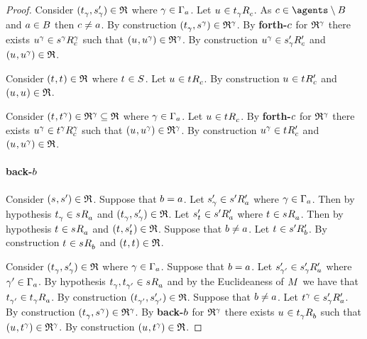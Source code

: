 \begin{proof}
Consider $(\kStateT_\gamma, \kStateSP_\gamma) \in \refinement$ where $\gamma \in \Gamma_\agentA$.
Let $\kStateU \in \kSuccessorsC{\kStateT_\gamma}$.
As $\agentC \in \agents \setminus \agentsB$ and $\agentA \in \agentsB$ then $\agentC \neq \agentA$.
By construction $(\kStateT_\gamma, \kStateS[\gamma]) \in \refinement^\gamma$.
By {\bf forth-$\agentC$} for $\refinement^\gamma$ there exists $\kStateU[\gamma] \in \kSuccessorsC[\gamma]{\kStateS[\gamma]}$ such that $(\kStateU, \kStateU[\gamma]) \in \refinement^\gamma$.
By construction $\kStateU[\gamma] \in \kSuccessorsPC{\kStateSP_\gamma}$ and $(\kStateU, \kStateU[\gamma]) \in \refinement$.

Consider $(\kStateT, \kStateT) \in \refinement$ where $\kStateT \in \kStates$.
Let $\kStateU \in \kSuccessorsC{\kStateT}$.
By construction $\kStateU \in \kSuccessorsPC{\kStateT}$ and $(\kStateU, \kStateU) \in \refinement$.

Consider $(\kStateT, \kStateT[\gamma]) \in \refinement^\gamma \subseteq \refinement$ where $\gamma \in \Gamma_\agentA$.
Let $\kStateU \in \kSuccessorsC{\kStateT}$.
By {\bf forth-$\agentC$} for $\refinement^\gamma$ there exists $\kStateU[\gamma] \in \kSuccessorsC[\gamma]{\kStateT[\gamma]}$ such that $(\kStateU, \kStateU[\gamma]) \in \refinement^\gamma$.
By construction $\kStateU[\gamma] \in \kSuccessorsPC{\kStateT}$ and $(\kStateU, \kStateU[\gamma]) \in \refinement$.

\paragraph{back-$\agentB$}
Consider $(\kStateS, \kStateSP) \in \refinement$.
Suppose that $\agentB = \agentA$.
Let $\kStateSP_\gamma \in \kSuccessorsPA{\kStateSP}$ where $\gamma \in \Gamma_\agentA$.
Then by hypothesis $\kStateT_\gamma \in \kSuccessorsA{\kStateS}$ and $(\kStateT_\gamma, \kStateSP_\gamma) \in \refinement$.
Let $\kStateSP_{\kStateT} \in \kSuccessorsPA{\kStateSP}$ where $\kStateT \in \kSuccessorsA{\kStateS}$.
Then by hypothesis $\kStateT \in \kSuccessorsA{\kStateS}$ and $(\kStateT, \kStateSP_{\kStateT}) \in \refinement$.
Suppose that $\agentB \neq \agentA$.
Let $\kStateT \in \kSuccessorsPB{\kStateSP}$.
By construction $\kStateT \in \kSuccessorsB{\kStateS}$ and $(\kStateT, \kStateT) \in \refinement$.

Consider $(\kStateT_\gamma, \kStateSP_\gamma) \in \refinement$ where $\gamma \in \Gamma_\agentA$.
Suppose that $\agentB = \agentA$.
Let $\kStateSP_{\gamma'} \in \kSuccessorsPA{\kStateSP_\gamma}$ where $\gamma' \in \Gamma_\agentA$.
By hypothesis $\kStateT_{\gamma}, \kStateT_{\gamma'} \in \kSuccessorsA{\kStateS}$ and by the Euclideaness of $\kModel$ we have that $\kStateT_{\gamma'} \in \kSuccessorsA{\kStateT_\gamma}$.
By construction $(\kStateT_{\gamma'}, \kStateSP_{\gamma'}) \in \refinement$.
Suppose that $\agentB \neq \agentA$.
Let $\kStateT[\gamma] \in \kSuccessorsPA{\kStateSP_\gamma}$.
By construction $(\kStateT_\gamma, \kStateS[\gamma]) \in \refinement^\gamma$.
By {\bf back-$\agentB$} for $\refinement^\gamma$ there exists $\kStateU \in \kSuccessorsB{\kStateT_\gamma}$ such that $(\kStateU, \kStateT[\gamma]) \in \refinement^\gamma$.
By construction $(\kStateU, \kStateT[\gamma]) \in \refinement$.


\end{proof}
